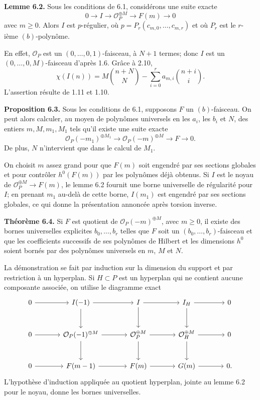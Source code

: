 \documentclass[11pt]{article}
\begin{document}
\textbf{Lemme 6.2.} Sous les conditions de 6.1, consid\'erons une suite exacte
\[
   0\longrightarrow I\longrightarrow \mathcal O_P^{\oplus M}\longrightarrow F(m)\longrightarrow0
\]
avec $m\ge0$. Alors $I$ est $p$-r\'egulier, o\`u $p=P_r(c_{m,0},\ldots,c_{m,r})$ et o\`u $P_r$ est le $r$-i\`eme $(b)$-polyn\^ome.

En effet, $\mathcal O_P$ est un $(0,\ldots,0,1)$-faisceau, \`a $N+1$ termes; donc $I$ est un $(0,\ldots,0,M)$-faisceau d'apr\`es 1.6. Gr\^ace \`a 2.10,
\[
   \chi(I(n))=M{n+N\choose N}-\sum_{i=0}^{r} a_{m,i}{n+i\choose i}.
\]
L'assertion r\'esulte de 1.11 et 1.10.

\textbf{Proposition 6.3.} Sous les conditions de 6.1, supposons $F$ un $(b)$-faisceau. On peut alors calculer, au moyen de polyn\^omes universels en les $a_i$, les $b_i$ et $N$, des entiers $m,M,m_1,M_1$ tels qu'il existe une suite exacte
\[
   \mathcal O_P(-m_1)^{\oplus M_1}\longrightarrow \mathcal O_P(-m)^{\oplus M}\longrightarrow F\longrightarrow0.
\]
De plus, $N$ n'intervient que dans le calcul de $M_1$.

On choisit $m$ assez grand pour que $F(m)$ soit engendr\'e par ses sections globales et pour contr\^oler $h^0(F(m))$ par les polyn\^omes d\'ej\`a obtenus. Si $I$ est le noyau de $\mathcal O_P^{\oplus M}\to F(m)$, le lemme 6.2 fournit une borne universelle de r\'egularit\'e pour $I$; en prenant $m_1$ au-del\`a de cette borne, $I(m_1)$ est engendr\'e par ses sections globales, ce qui donne la pr\'esentation annonc\'ee apr\`es torsion inverse.

\textbf{Th\'eor\`eme 6.4.} Si $F$ est quotient de $\mathcal O_P(-m)^{\oplus M}$, avec $m\ge0$, il existe des bornes universelles explicites $b_0,\ldots,b_r$ telles que $F$ soit un $(b_0,\ldots,b_r)$-faisceau et que les coefficients successifs de ses polyn\^omes de Hilbert et les dimensions $h^0$ soient born\'es par des polyn\^omes universels en $m$, $M$ et $N$.

La d\'emonstration se fait par induction sur la dimension du support et par restriction \`a un hyperplan. Si $H\subset P$ est un hyperplan qui ne contient aucune composante associ\'ee, on utilise le diagramme exact
\[
\begin{tikzcd}[column sep=large,row sep=large]
0 \arrow[r] & I(-1) \arrow[r] \arrow[d] & I \arrow[r] \arrow[d] & I_H \arrow[r] \arrow[d] & 0 \\
0 \arrow[r] & \mathcal O_P(-1)^{\oplus M} \arrow[r] \arrow[d] & \mathcal O_P^{\oplus M} \arrow[r] \arrow[d] & \mathcal O_H^{\oplus M} \arrow[r] \arrow[d] & 0 \\
0 \arrow[r] & F(m-1) \arrow[r] & F(m) \arrow[r] & G(m) \arrow[r] & 0 .
\end{tikzcd}
\]
L'hypoth\`ese d'induction appliqu\'ee au quotient hyperplan, jointe au lemme 6.2 pour le noyau, donne les bornes universelles.
\end{document}
